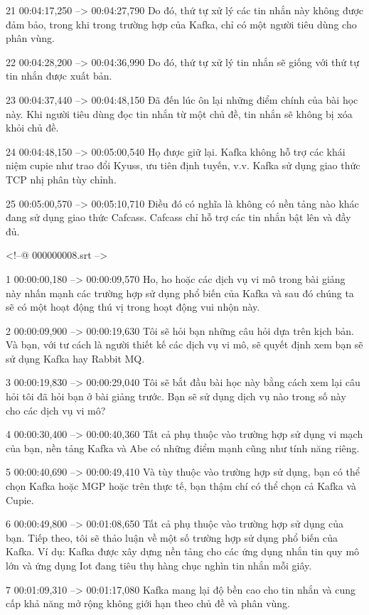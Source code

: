 21
00:04:17,250 --> 00:04:27,790
Do đó, thứ tự xử lý các tin nhắn này không được đảm bảo, trong khi trong trường hợp của Kafka, chỉ có một người tiêu dùng cho phân vùng.

22
00:04:28,200 --> 00:04:36,990
Do đó, thứ tự xử lý tin nhắn sẽ giống với thứ tự tin nhắn được xuất bản.

23
00:04:37,440 --> 00:04:48,150
Đã đến lúc ôn lại những điểm chính của bài học này.  Khi người tiêu dùng đọc tin nhắn từ một chủ đề, tin nhắn sẽ không bị xóa khỏi chủ đề.

24
00:04:48,150 --> 00:05:00,540
Họ được giữ lại.  Kafka không hỗ trợ các khái niệm cupie như trao đổi Kyuss, ưu tiên định tuyến, v.v. Kafka sử dụng giao thức TCP nhị phân tùy chỉnh.

25
00:05:00,570 --> 00:05:10,710
Điều đó có nghĩa là không có nền tảng nào khác đang sử dụng giao thức Cafcass.  Cafcass chỉ hỗ trợ các tin nhắn bật lên và đầy đủ.

<!--@ 000000008.srt -->

1
00:00:00,180 --> 00:00:09,570
Ho, ho hoặc các dịch vụ vi mô trong bài giảng này nhấn mạnh các trường hợp sử dụng phổ biến của Kafka và sau đó chúng ta sẽ có một hoạt động thú vị trong hoạt động vui nhộn này.

2
00:00:09,900 --> 00:00:19,630
Tôi sẽ hỏi bạn những câu hỏi dựa trên kịch bản.  Và bạn, với tư cách là người thiết kế các dịch vụ vi mô, sẽ quyết định xem bạn sẽ sử dụng Kafka hay Rabbit MQ.

3
00:00:19,830 --> 00:00:29,040
Tôi sẽ bắt đầu bài học này bằng cách xem lại câu hỏi tôi đã hỏi bạn ở bài giảng trước.  Bạn sẽ sử dụng dịch vụ nào trong số này cho các dịch vụ vi mô?

4
00:00:30,400 --> 00:00:40,360
Tất cả phụ thuộc vào trường hợp sử dụng vi mạch của bạn, nền tảng Kafka và Abe có những điểm mạnh cũng như tính năng riêng.

5
00:00:40,690 --> 00:00:49,410
Và tùy thuộc vào trường hợp sử dụng, bạn có thể chọn Kafka hoặc MGP hoặc trên thực tế, bạn thậm chí có thể chọn cả Kafka và Cupie.

6
00:00:49,800 --> 00:01:08,650
Tất cả phụ thuộc vào trường hợp sử dụng của bạn.  Tiếp theo, tôi sẽ thảo luận về một số trường hợp sử dụng phổ biến của Kafka.  Ví dụ: Kafka được xây dựng nền tảng cho các ứng dụng nhắn tin quy mô lớn và ứng dụng Iot đang tiêu thụ hàng chục nghìn tin nhắn mỗi giây.

7
00:01:09,310 --> 00:01:17,080
Kafka mang lại độ bền cao cho tin nhắn và cung cấp khả năng mở rộng không giới hạn theo chủ đề và phân vùng.

